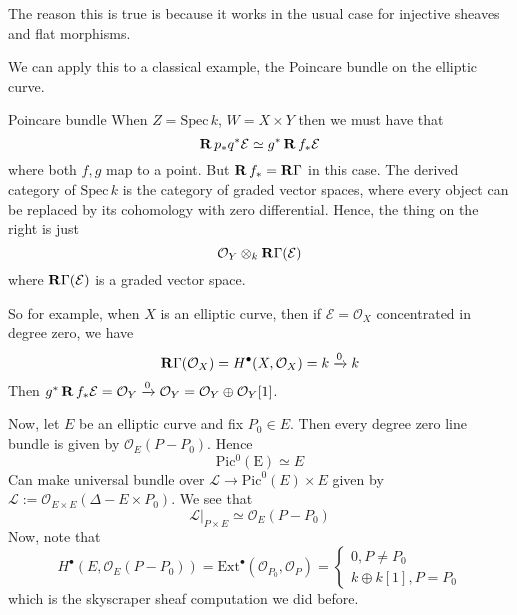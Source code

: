 The reason this is true is because it works in the usual case for injective sheaves and flat morphisms.

We can apply this to a classical example, the Poincare bundle on the elliptic curve.
\begin{example}{Poincare bundle}{}
When $Z=\mathrm{Spec}\,k$, $W=X\times Y$ then we must have that $$\operatorname{\mathbf{R}} p_{*}q^* \mathcal{E}\simeq g^* \operatorname{\mathbf{R}} f_{*}\mathcal{E}$$where both $f,g$ map to a point. But $\operatorname{\mathbf{R}} f_{*}=\operatorname{\mathbf{R}\Gamma}$ in this case. The derived category of $\mathrm{Spec}\,k$ is the category of graded vector spaces, where every object can be replaced by its cohomology with zero differential. Hence, the thing on the right is just $$\mathcal{O}_{Y}\otimes_{k} \operatorname{\mathbf{R}\Gamma} (\mathcal{E})$$where $\operatorname{\mathbf{R}\Gamma}(\mathcal{E})$ is a graded vector space.

So for example, when $X$ is an elliptic curve, then if $\mathcal{E}=\mathcal{O}_{X}$ concentrated in degree zero, we have $$\operatorname{\mathbf{R}\Gamma}(\mathcal{O}_{X})=H^\bullet(X,\mathcal{O}_{X})=k\xrightarrow{0}k$$Then $g^* \operatorname{\mathbf{R}} f_*\mathcal{E}= \mathcal{O}_{Y}\xrightarrow{0}\mathcal{O}_{Y}= \mathcal{O}_{Y}\oplus \mathcal{O}_{Y}[1]$. 

Now, let $E$ be an elliptic curve and fix $P_0\in E$. Then every degree zero line bundle is given by $\mathcal{O}_{E}(P-P_{0})$. Hence $$\mathrm{Pic^0(E)}\simeq E$$Can make universal bundle over $\mathcal{L}\xrightarrow{} \mathrm{Pic}^0(E)\times E$ given by $\mathcal{L}:=\mathcal{O}_{E\times E}(\Delta-E\times P_{0})$. We see that $$\mathcal{L}|_{P\times E}\simeq \mathcal{O}_{E}(P-P_{0})$$Now, note that $$H^\bullet (E, \mathcal{O}_{E}(P-P_{0}))=\mathrm{Ext}^\bullet(\mathcal{O}_{P_{0}},\mathcal{O}_{P})=\begin{cases}0, P\neq P_{0}\\ k\oplus k[1], P=P_{0}\end{cases} $$which is the skyscraper sheaf computation we did before.

\end{example}

